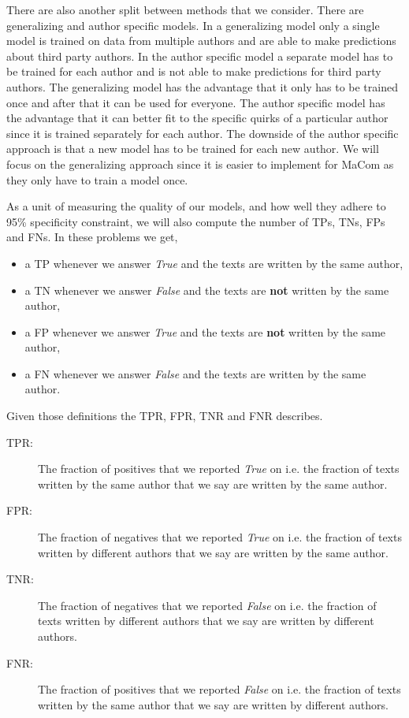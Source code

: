 There are also another split between methods that we consider. There are
generalizing and author specific models. In a generalizing model only a single
model is trained on data from multiple authors and are able to make predictions
about third party authors. In the author specific model a separate model has
to be trained for each author and is not able to make predictions for third
party authors. The generalizing model has the advantage that it only has to be
trained once and after that it can be used for everyone. The author specific
model has the advantage that it can better fit to the specific quirks of a
particular author since it is trained separately for each author. The downside
of the author specific approach is that a new model has to be trained for each
new author. We will focus on the generalizing approach since it is easier to
implement for MaCom as they only have to train a model once.

As a unit of measuring the quality of our models, and how well they adhere to
95\% specificity constraint, we will also compute the number of \gls{TP}s, \gls{TN}s,
\gls{FP}s and \gls{FN}s. In these problems we get,

\begin{itemize}
    \item a \gls{TP} whenever we answer \textit{True} and the texts are written
        by the same author,
    \item a \gls{TN} whenever we answer \textit{False} and the texts are
        \textbf{not} written by the same author,
    \item a \gls{FP} whenever we answer \textit{True} and the texts are
        \textbf{not} written by the same author,
    \item a \gls{FN} whenever we answer \textit{False} and the texts are written
        by the same author.
\end{itemize}

Given those definitions the \gls{TPR}, \gls{FPR}, \gls{TNR} and \gls{FNR}
describes.

\begin{description}
    \item[\gls{TPR}: ] The fraction of positives that we reported \textit{True}
        on i.e. the fraction of texts written by the same author that we say are
        written by the same author.
    \item[\gls{FPR}: ] The fraction of negatives that we reported \textit{True}
        on i.e. the fraction of texts written by different authors that we say
        are written by the same author.
    \item[\gls{TNR}: ] The fraction of negatives that we reported \textit{False}
        on i.e. the fraction of texts written by different authors that we say
        are written by different authors.
    \item[\gls{FNR}: ] The fraction of positives that we reported \textit{False}
        on i.e. the fraction of texts written by the same author that we say are
        written by different authors.
\end{description}

